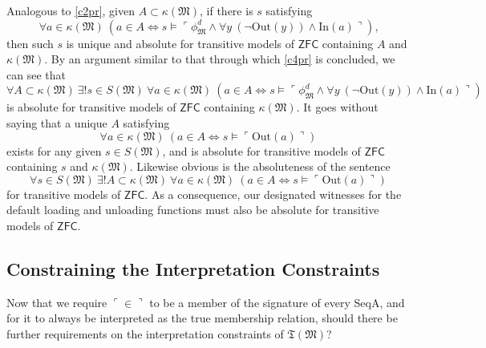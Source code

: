 \documentclass[12pt]{article}
\numberwithin{equation}{section}
\begin{document}
Analogous to \ref{c2pr}, given $A \subset \kappa(\mathfrak{M})$, if there is $s$ satisfying
\begin{equation*}
    \forall a \in \kappa(\mathfrak{M}) \ (a \in A \iff s \models \ulcorner \phi^d_{\mathfrak{M}} \wedge \forall y \ (\neg \mathrm{Out}(y)) \wedge \mathrm{In}(a) \urcorner) \text{,}
\end{equation*}
then such $s$ is unique and absolute for transitive models of $\mathsf{ZFC}$ containing $A$ and $\kappa(\mathfrak{M})$. By an argument similar to that through which \ref{c4pr} is concluded, we can see that 
\begin{equation*}
    \forall A \subset \kappa(\mathfrak{M}) \ \exists ! s \in S(\mathfrak{M}) \ \forall a \in \kappa(\mathfrak{M}) \ (a \in A \iff s \models \ulcorner \phi^d_{\mathfrak{M}} \wedge \forall y \ (\neg \mathrm{Out}(y)) \wedge \mathrm{In}(a) \urcorner)
\end{equation*}
is absolute for transitive models of $\mathsf{ZFC}$ containing $\kappa(\mathfrak{M})$. It goes without saying that a unique $A$ satisfying
\begin{equation*}
    \forall a \in \kappa(\mathfrak{M}) \ (a \in A \iff s \models \ulcorner \mathrm{Out}(a) \urcorner)
\end{equation*}
exists for any given $s \in S(\mathfrak{M})$, and is absolute for transitive models of $\mathsf{ZFC}$ containing $s$ and $\kappa(\mathfrak{M})$. Likewise obvious is the absoluteness of the sentence
\begin{equation*}
    \forall s \in S(\mathfrak{M}) \ \exists ! A \subset \kappa(\mathfrak{M}) \ \forall a \in \kappa(\mathfrak{M}) \ (a \in A \iff s \models \ulcorner \mathrm{Out}(a) \urcorner)
\end{equation*}
for transitive models of $\mathsf{ZFC}$. As a consequence, our designated witnesses for the default loading and unloading functions must also be absolute for transitive models of $\mathsf{ZFC}$.

\subsection{Constraining the Interpretation Constraints} 

Now that we require $\ulcorner \in \urcorner$ to be a member of the signature of every SeqA, and for it to always be interpreted as the true membership relation, should there be further requirements on the interpretation constraints of $\mathfrak{T}(\mathfrak{M})$?
\end{document}
